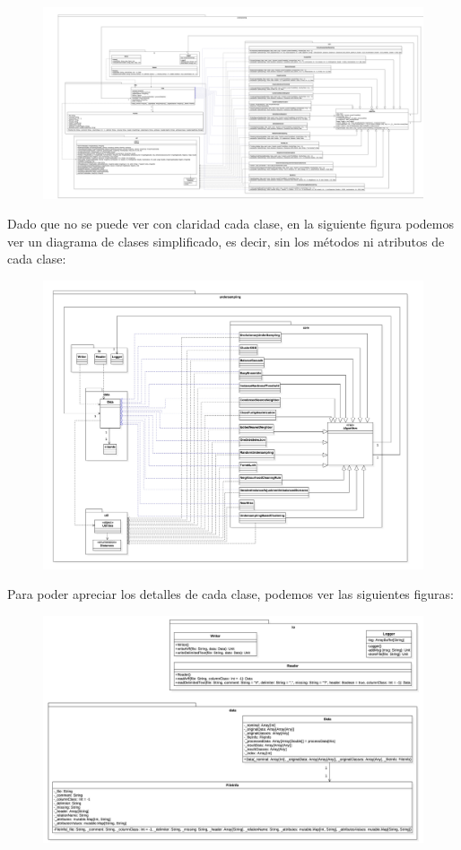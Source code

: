 \begin{figure}[H]
\includegraphics[scale=0.08, angle=90]{./imagenes/3_clases.jpg}
\end{figure}

Dado que no se puede ver con claridad cada clase, en la siguiente figura podemos ver un diagrama de clases simplificado, es decir, sin los métodos ni atributos de cada clase:

\begin{figure}[H]
\includegraphics[scale=0.14, angle=90]{./imagenes/3_clases_simplificado.jpg}
\end{figure}

Para poder apreciar los detalles de cada clase, podemos ver las siguientes figuras:

\begin{figure}[H]
\includegraphics[scale=0.2, angle=90]{./imagenes/3_clases_detalles_pt1.jpg}
\end{figure}

